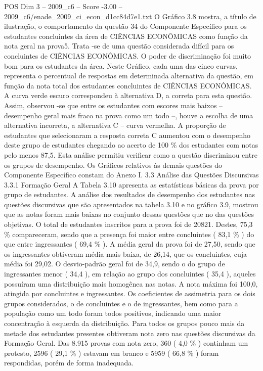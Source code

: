 \begin{textsample}{POS Dim 3 – 2009\_c6 – Score -3.00 – 2009\_c6/enade\_2009\_ci\_econ\_d1cc84d7e1.txt}
O Gráfico 3.8 mostra, a título de ilustração, o comportamento da questão 34 do Componente Específico para os estudantes concluintes da área de CIÊNCIAS ECONÔMICAS como função da nota geral na prova5.
Trata -se de uma questão considerada difícil para os concluintes de CIÊNCIAS ECONÔMICAS.
O poder de discriminação foi muito bom para os estudantes da área.
Neste Gráfico, cada uma das cinco curvas, representa o percentual de respostas em determinada alternativa da questão, em função da nota total dos estudantes concluintes de CIÊNCIAS ECONÔMICAS.
A curva verde escuro correspondeu à alternativa D, a correta para esta questão.
Assim, observou -se que entre os estudantes com escores mais baixos – desempenho geral mais fraco na prova como um todo –, houve a escolha de uma alternativa incorreta, a alternativa C – curva vermelha.
A proporção de estudantes que selecionaram a resposta correta C aumentou com o desempenho deste grupo de estudantes chegando ao acerto de 100 \% dos estudantes com notas pelo menos 87,5.
Esta análise permitiu verificar como a questão discriminou entre os grupos de desempenho.
Os Gráficos relativos às demais questões do Componente Específico constam do Anexo I. 3.3 Análise das Questões Discursivas 3.3.1 Formação Geral A Tabela 3.10 apresenta as estatísticas básicas da prova por grupo de estudantes.
A análise dos resultados de desempenho dos estudantes nas questões discursivas que são apresentados na tabela 3.10 e no gráfico 3.9, mostrou que as notas foram mais baixas no conjunto dessas questões que no das questões objetivas.
O total de estudantes inscritos para a prova foi de 20821.
Destes, 75,3 \% compareceram, sendo que a presença foi maior entre concluintes ( 83,1 \% ) do que entre ingressantes ( 69,4 \% ).
A média geral da prova foi de 27,50, sendo que os ingressantes obtiveram média mais baixa, de 26,14, que os concluintes, cuja média foi 29,02.
O desvio-padrão geral foi de 34,9, sendo o do grupo de ingressantes menor ( 34,4 ), em relação ao grupo dos concluintes ( 35,4 ), aqueles possuíram uma distribuição mais homogênea nas notas.
A nota máxima foi 100,0, atingida por concluintes e ingressantes.
Os coeficientes de assimetria para os dois grupos considerados, o de concluintes e o de ingressantes, bem como para a população como um todo foram todos positivos, indicando uma maior concentração à esquerda da distribuição.
Para todos os grupos pouco mais da metade dos estudantes presentes obtiveram nota zero nas questões discursivas da Formação Geral.
Das 8.915 provas com nota zero, 360 ( 4,0 \% ) continham um protesto, 2596 ( 29,1 \% ) estavam em branco e 5959 ( 66,8 \% ) foram respondidas, porém de forma inadequada.

\end{textsample}
